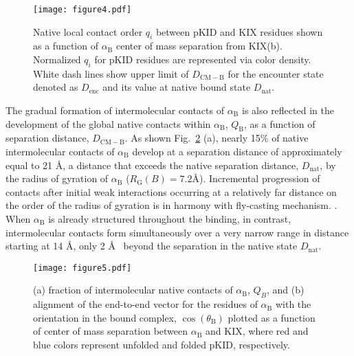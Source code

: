 \documentclass[../talant.diss.submit.tex]{subfiles}
\begin{document}
\begin{figure}[htb]
  \centering
  \texttt{[image: figure4.pdf]}
  \caption{Native local contact order $q_{i}$ between pKID and KIX residues shown
    as a function of $\alpha_{\mathrm{B}}$ center of mass separation from
    KIX(b). Normalized $q_{i}$ for pKID residues are represented via color
    density. White dash lines show upper limit of $D_{\mathrm{CM-B}}$ for the
    encounter state denoted as $D_{\mathrm{enc}}$ and its value at native bound
    state $D_{\mathrm{nat}}$.}
  \label{fig:figure4}
\end{figure}

The gradual formation of intermolecular contacts of $\alpha_{\mathrm{B}}$ is
also reflected in the development of the global native contacts within
$\alpha_\mathrm{B}$, $Q_\mathrm{B}$, as a function of separation distance,
$D_\mathrm{CM-B}$.  As shown Fig.~\ref{fig:figure5} (a), nearly 15\% of native
intermolecular contacts of $\alpha_{\mathrm{B}}$ develop at a separation
distance of approximately equal to 21 \AA, a distance that exceeds the native
separation distance, $D_\mathrm{nat}$, by the radius of gyration of
$\alpha_{\mathrm{B}}$ ($R_\mathrm{G}(B)= 7.2$\AA). Incremental progression of
contacts after initial weak interactions occurring at a relatively far distance
on the order of the radius of gyration is in harmony with fly-casting mechanism.
\cite{shoeportman:00}. When $\alpha_\mathrm{B}$ is already structured throughout
the binding, in contrast, intermolecular contacts form simultaneously over a
very narrow range in distance starting at 14 \AA, only 2 \AA~ beyond the
separation in the native state $D_\mathrm{nat}$.

\begin{figure}[htb]
  \centering
  \texttt{[image: figure5.pdf]}
  \caption{ (a) fraction of intermolecular native contacts of
    $\alpha_{\mathrm{B}}$, $Q_B$, and (b) alignment of the end-to-end vector for
    the residues of $\alpha_{\mathrm{B}}$ with the orientation in the bound
    complex, $\cos(\theta_\mathrm{B})$ plotted as a function of center of mass
    separation between $\alpha_{\mathrm{B}}$ and KIX, where red and blue colors
    represent unfolded and folded pKID, respectively.}
  \label{fig:figure5}
\end{figure}
\end{document}
